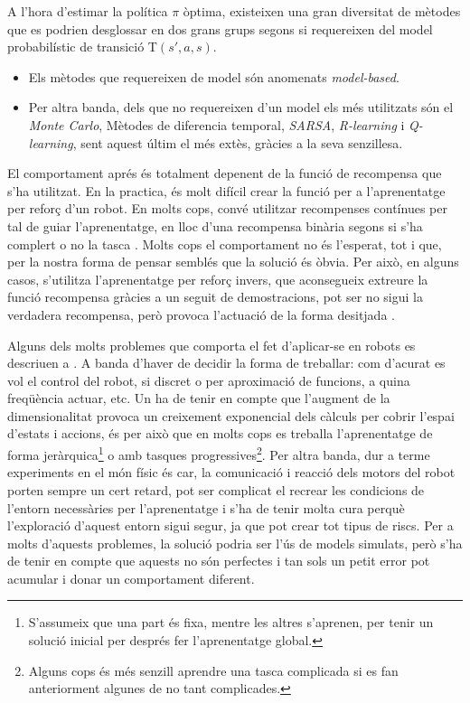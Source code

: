 \documentclass[12pt,a4paper,final,twoside]{article}
\begin{document}
A l'hora d'estimar la política $\pi$ òptima, existeixen una gran diversitat de mètodes que es podrien desglossar en dos grans grups segons si requereixen del model probabilístic de transició T$(s',a,s)$.

\begin{itemize}

\item Els mètodes que requereixen de model són anomenats \textit{model-based}.

\item Per altra banda, dels que no requereixen d'un model els més utilitzats són el \textit{Monte Carlo}, Mètodes de diferencia temporal, \textit{SARSA}, \textit{R-learning} i \textit{Q-learning}, sent aquest últim el més extès, gràcies a la seva senzillesa.

\end{itemize}

El comportament aprés és totalment depenent de la funció de recompensa que s'ha utilitzat. En la practica, és molt difícil crear la funció per a l'aprenentatge per reforç d'un robot. En molts cops, convé utilitzar recompenses contínues per tal de guiar l'aprenentatge, en lloc d'una recompensa binària segons si s'ha complert o no la tasca \cite{Laud2004}. Molts cops el comportament no és l'esperat, tot i que, per la nostra forma de pensar semblés que la solució és òbvia. Per això, en alguns casos, s'utilitza l'aprenentatge per reforç invers, que aconsegueix extreure la funció recompensa gràcies a un seguit de demostracions, pot ser no sigui la verdadera recompensa, però provoca l'actuació de la forma desitjada \cite{Kober2009}.

Alguns dels molts problemes que comporta el fet d'aplicar-se en robots es descriuen a \cite{Kober2009}. A banda d'haver de decidir la forma de treballar: com d'acurat es vol el control del robot, si discret o per aproximació de funcions, a quina freqüència actuar, etc. Un ha de tenir en compte que l'augment de la dimensionalitat provoca un creixement exponencial dels càlculs per cobrir l'espai d'estats i accions, és per això que en molts cops es treballa l'aprenentatge de forma jeràrquica\footnote{S'assumeix que una part és fixa, mentre les altres s'aprenen, per tenir un solució inicial per després fer l'aprenentatge global.} o amb tasques progressives\footnote{Alguns cops és més senzill aprendre una tasca complicada si es fan anteriorment algunes de no tant complicades.}. 
Per altra banda, dur a terme experiments en el món físic és car, la comunicació i reacció dels motors del robot porten sempre un cert retard, pot ser complicat el recrear les condicions de l'entorn necessàries per l'aprenentatge i s'ha de tenir molta cura perquè l'exploració d'aquest entorn sigui segur, ja que pot crear tot tipus de riscs. Per a molts d'aquests problemes, la solució podria ser l'ús de models simulats, però s'ha de tenir en compte que aquests no són perfectes i tan sols un petit error pot acumular i donar un comportament diferent.
\end{document}
